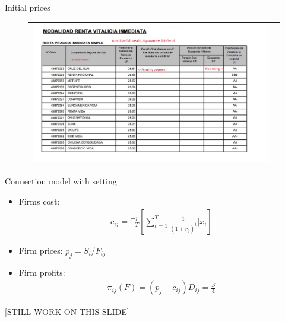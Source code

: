 \documentclass[10pt,aspectratio=169]{beamer}
\begin{document}
\begin{frame}{Initial prices}\label{slide:fig_offer_certificate}    
\begin{figure}[H]
\centering{}%
\begin{tabular}{cc}
\includegraphics[scale=0.49]{../figures/docs_screenshots/annuity_offer.png}
\end{tabular}
\end{figure}
\hyperlink{slide:setting2}{} 
\hyperlink{slide:data}{}
\end{frame}


\begin{frame}{Connection model with setting}\label{slide:connection}    
\begin{itemize}
    \item Firms cost: 
    \begin{align*}
        c_{ij} =  \mathbb{E}^j_{T} \left[\sum_{t=1}^T\frac{1}{(1+r_j)^t}|x_i \right]
    \end{align*}  
    \item Firm prices: $p_j = S_i/F_{ij}$
    \item Firm profits: 
    \begin{align*}
        \pi_{ij}(F) = (p_j - c_{ij}) D_{ij} = \frac{S}{4}
    \end{align*}
\end{itemize}

\hyperlink{slide:timeline}{}
[STILL WORK ON THIS SLIDE]
\end{frame}
\end{document}
